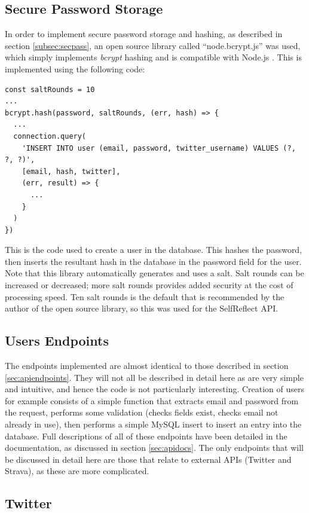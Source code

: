 \documentclass[11pt,openright,a4paper]{report}
\begin{document}
\subsection{Secure Password Storage}
In order to implement secure password storage and hashing, as described in section \ref{subsec:secpass}, an open source library called \enquote{node.bcrypt.js} was used, which simply implements \emph{bcrypt} hashing and is compatible with Node.js \parencite{nodebcrypt}. This is implemented using the following code:
\begin{lstlisting}
const saltRounds = 10
...
bcrypt.hash(password, saltRounds, (err, hash) => {
  ...
  connection.query(
    'INSERT INTO user (email, password, twitter_username) VALUES (?, ?, ?)',
    [email, hash, twitter],
    (err, result) => {
      ...
    }
  )
})
\end{lstlisting}
This is the code used to create a user in the database. This hashes the password, then inserts the resultant hash in the database in the password field for the user. Note that this library automatically generates and uses a salt. Salt rounds can be increased or decreased; more salt rounds provides added security at the cost of processing speed. Ten salt rounds is the default that is recommended by the author of the open source library, so this was used for the SelfReflect API.

\subsection{Users Endpoints} \label{sec:apiimplusers}
The endpoints implemented are almost identical to those described in section \ref{sec:apiendpoints}. They will not all be described in detail here as are very simple and intuitive, and hence the code is not particularly interesting. Creation of users for example consists of a simple function that extracts email and password from the request, performs some validation (checks fields exist, checks email not already in use), then performs a simple MySQL insert to insert an entry into the database. Full descriptions of all of these endpoints have been detailed in the documentation, as discussed in section \ref{sec:apidocs}. The only endpoints that will be discussed in detail here are those that relate to external APIs (Twitter and Strava), as these are more complicated.

\subsection{Twitter} \label{sec:apiconnecttwitter}
\end{document}

